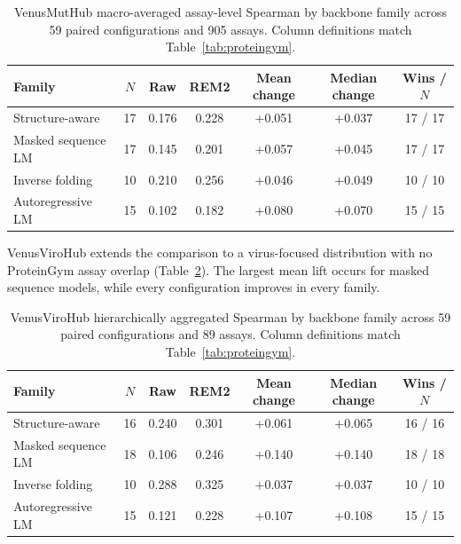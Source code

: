 \documentclass{article} %
\begin{document}
\begin{table}[!ht]
\caption{VenusMutHub macro-averaged assay-level Spearman by backbone family across 59 paired configurations and 905 assays. Column definitions match Table~\ref{tab:proteingym}.}
\label{tab:venusmuthub}
\begin{center}
\footnotesize
\setlength{\tabcolsep}{4pt}
\begin{tabular}{lcccccc}
\toprule
Family & $N$ & Raw & \textsc{REM2} & Mean change & Median change & Wins / $N$ \\
\midrule
Structure-aware & 17 & 0.176 & 0.228 & +0.051 & +0.037 & 17 / 17 \\
Masked sequence LM & 17 & 0.145 & 0.201 & +0.057 & +0.045 & 17 / 17 \\
Inverse folding & 10 & 0.210 & 0.256 & +0.046 & +0.049 & 10 / 10 \\
Autoregressive LM & 15 & 0.102 & 0.182 & +0.080 & +0.070 & 15 / 15 \\
\bottomrule
\end{tabular}
\end{center}
\end{table}

VenusViroHub extends the comparison to a virus-focused distribution with no ProteinGym assay overlap (Table~\ref{tab:virogym_family}). The largest mean lift occurs for masked sequence models, while every configuration improves in every family.

\begin{table}[!ht]
\caption{VenusViroHub hierarchically aggregated Spearman by backbone family across 59 paired configurations and 89 assays. Column definitions match Table~\ref{tab:proteingym}.}
\label{tab:virogym_family}
\begin{center}
\footnotesize
\setlength{\tabcolsep}{4pt}
\begin{tabular}{lcccccc}
\toprule
Family & $N$ & Raw & \textsc{REM2} & Mean change & Median change & Wins / $N$ \\
\midrule
Structure-aware & 16 & 0.240 & 0.301 & +0.061 & +0.065 & 16 / 16 \\
Masked sequence LM & 18 & 0.106 & 0.246 & +0.140 & +0.140 & 18 / 18 \\
Inverse folding & 10 & 0.288 & 0.325 & +0.037 & +0.037 & 10 / 10 \\
Autoregressive LM & 15 & 0.121 & 0.228 & +0.107 & +0.108 & 15 / 15 \\
\bottomrule
\end{tabular}
\end{center}
\end{table}
\end{document}
